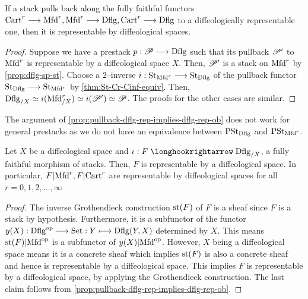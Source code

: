 \documentclass[11pt]{amsart}
\begin{document}
\begin{prop}\label{prop:pullback-dflg-rep-implies-dflg-rep-ob}
If a stack pulls back along the fully faithful functors
$\Cart^r \to \Mfd^r, \Mfd^r \to \Dflg, \Cart^r \to \Dflg$ to a diffeologically representable one,
then it is representable by diffeological spaces.
\end{prop}
\begin{proof}
Suppose we have a prestack $p : \sP \to \Dflg$ such that its pullback $\mathscr{P}'$ to $\mathrm{Mfd}^r$ is
representable by a diffeological space $X$. Then, $\mathscr{P}'$ is a stack on $\mathrm{Mfd}^r$ by
\cref{prop:dflg-sp-st}. Choose a $2$--inverse $i : \St_{\Mfd^r} \to \St_{\Dflg}$
of the pullback functor $\St_{\Dflg} \to \St_{\Mfd^r}$ by \cref{thm:St-Cr-Cinf-equiv}. Then,
$\mathrm{Dflg}_{/X} \simeq i(\mathrm{Mfd}^r_{/X}) \simeq i(\mathscr{P}') \simeq \mathscr{P}$. The proofs for the other cases
are similar.
\end{proof}

\begin{warn}
The argument of \cref{prop:pullback-dflg-rep-implies-dflg-rep-ob} does not work
for general prestacks as we do not have an equivalence between
$\mathrm{PSt}_{\mathrm{Dflg}}$ and $\mathrm{PSt}_{\mathrm{Mfd}^r}$.
\end{warn}

\begin{prop}\label{prop:subfunc-dflg}
Let $X$ be a diffeological space and $\iota : F \hto \Dflg_{/X}$, a fully faithful morphism of
stacks. Then, $F$ is representable by a diffeological space.
In particular, $F|\mathrm{Mfd}^r, F|\mathrm{Cart}^r$ are representable by diffeological spaces for all
$r = 0, 1, 2, \dots, \infty$
\end{prop}
\begin{proof}
The inverse Grothendieck construction $\mathrm{st}(F)$ of $F$ is a sheaf since $F$ is a stack
by hypothesis. Furthermore, it is a subfunctor
of the functor $y(X) : \Dflg^\op \to \Set : Y \mapsto \Dflg(Y, X)$ determined by $X$.
This means $\mathrm{st}(F)|\mathrm{Mfd}^{\mathrm{op}}$ is a subfunctor of $y(X)|\mathrm{Mfd}^{\mathrm{op}}$. However, $X$ being a diffeological
space means it is a concrete sheaf which implies $\mathrm{st}(F)$ is also a concrete sheaf and hence
is representable by a diffeological space. This implies $F$ is representable by a diffeological
space, by applying the Grothendieck construction. The last claim follows from
\cref{prop:pullback-dflg-rep-implies-dflg-rep-ob}.
\end{proof}
\end{document}
